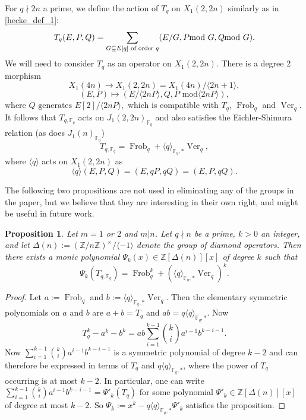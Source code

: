 \documentclass[11pt,reqno]{amsart}
\DeclareMathOperator{\Frob}{Frob}
\DeclareMathOperator{\Ver}{Ver}
\newtheorem{proposition}[theorem]{Proposition}
\theoremstyle{definition}
\numberwithin{equation}{section}
\newcommand{\Z}{\mathbb{Z}}
\newcommand{\F}{\mathbb{F}}
\def\torz#1{\mathbb Z /#1 \mathbb Z}
\newcommand{\diamondop}[1]{\langle #1 \rangle} %
\begin{document}
For $q\nmid 2n$ a prime, we define the action of $T_q$ on $X_1(2,2n)$ similarly as in \eqref{hecke_def_1}:
\begin{equation}\label{hecke_def_2}
    T_q(E,P,Q)=\sum_{G \subseteq E[q] \text{ of order $q$}}(E/G, P \hspace{-0.25cm}\mod G, Q \hspace{-0.25cm}\mod G).
\end{equation}
We will need to consider $T_q$ as an operator on $X_1(2,2n)$. There is a degree 2 morphism 
$$X_1(4n)\rightarrow X_1(2,2n)=X_1(4n)/\diamondop{2n+1},$$
$$(E,P)\mapsto (E/\diamondop{2nP}, Q, P  \text{ mod}\diamondop{2nP}), $$
$\text{where }Q \text{ generates } E[2] /\diamondop{2nP},$ which is compatible with $T_q$, $\Frob_q$ and $\Ver_q$. It follows that $T_{q,\F_q}$ acts on $J_1(2,2n)_{\F_q}$ and also satisfies the Eichler-Shimura relation (as does $J_1(n)_{\F_q}$) 
\begin{equation}T_{q,\F_q}=\Frob_q+\diamondop{q}_{\F_q,*}\Ver_q, \label{eq:Eichler-Shimura}\end{equation} where $\diamondop{q}$ acts on $X_1(2,2n)$ as 
$$\diamondop{q}(E,P,Q)=(E,qP,qQ)=(E,P,qQ).$$

The following two propositions are not used in eliminating any of the groups in the paper, but we believe that they are interesting in their own right, and might be useful in future work. 

\begin{proposition} \label{prop:power-eichler-shimura}
Let $m=1$ or $2$ and $m|n$. Let $q\nmid n$ be a prime, $k>0$ an integer, and let $\Delta(n):=(\torz n)^\times/\diamondop{-1}$ denote the group of diamond operators. Then there exists a monic polynomial $\Psi_k(x) \in \Z[\Delta(n)][x]$ of degree $k$ such that $$\Psi_k(T_{q,\F_q})=\Frob_q^k+(\diamondop{q}_{\F_q,*}\Ver_q)^k.$$
\end{proposition}
\begin{proof}
Let $a :=\Frob_q$ and $b := \diamondop{q}_{\F_q,*}\Ver_q$. Then the elementary symmetric polynomials on $a$ and $b$ are $a+b = T_q$ and $ab = q\diamondop{q}_{\F_q,*}$. Now 
\[T_q^k - a^k-b^k = ab\sum_{i=1}^{k-1} \binom k i a^{i-1}b^{k-i-1}.
\]
Now $\sum_{i=1}^{k-1} \binom k i a^{i-1}b^{k-i-1}$ is a symmetric polynomial of degree $k-2$ and can therefore be expressed in terms of $T_q$ and $q\diamondop{q}_{\F_q,*}$, where the power of $T_q$ occurring is at most $k-2$.  In particular, one can write $\sum_{i=1}^{k-1} \binom k i a^{i-1}b^{k-i-1} = \Psi'_k(T_q)$ for some polynomial $\Psi'_k \in \Z[\Delta(n)][x]$ of degree at most $k-2$. So $\Psi_k := x^k -q\diamondop{q}_{\F_q,*}\Psi'_k$ satisfies the proposition.
\end{proof}
\end{document}
